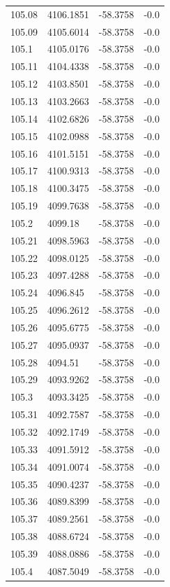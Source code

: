 \begin{table}[H]
\begin{tabular}{llll}
105.08 & 4106.1851 & -58.3758 & -0.0 \\
105.09 & 4105.6014 & -58.3758 & -0.0 \\
105.1 & 4105.0176 & -58.3758 & -0.0 \\
105.11 & 4104.4338 & -58.3758 & -0.0 \\
105.12 & 4103.8501 & -58.3758 & -0.0 \\
105.13 & 4103.2663 & -58.3758 & -0.0 \\
105.14 & 4102.6826 & -58.3758 & -0.0 \\
105.15 & 4102.0988 & -58.3758 & -0.0 \\
105.16 & 4101.5151 & -58.3758 & -0.0 \\
105.17 & 4100.9313 & -58.3758 & -0.0 \\
105.18 & 4100.3475 & -58.3758 & -0.0 \\
105.19 & 4099.7638 & -58.3758 & -0.0 \\
105.2 & 4099.18 & -58.3758 & -0.0 \\
105.21 & 4098.5963 & -58.3758 & -0.0 \\
105.22 & 4098.0125 & -58.3758 & -0.0 \\
105.23 & 4097.4288 & -58.3758 & -0.0 \\
105.24 & 4096.845 & -58.3758 & -0.0 \\
105.25 & 4096.2612 & -58.3758 & -0.0 \\
105.26 & 4095.6775 & -58.3758 & -0.0 \\
105.27 & 4095.0937 & -58.3758 & -0.0 \\
105.28 & 4094.51 & -58.3758 & -0.0 \\
105.29 & 4093.9262 & -58.3758 & -0.0 \\
105.3 & 4093.3425 & -58.3758 & -0.0 \\
105.31 & 4092.7587 & -58.3758 & -0.0 \\
105.32 & 4092.1749 & -58.3758 & -0.0 \\
105.33 & 4091.5912 & -58.3758 & -0.0 \\
105.34 & 4091.0074 & -58.3758 & -0.0 \\
105.35 & 4090.4237 & -58.3758 & -0.0 \\
105.36 & 4089.8399 & -58.3758 & -0.0 \\
105.37 & 4089.2561 & -58.3758 & -0.0 \\
105.38 & 4088.6724 & -58.3758 & -0.0 \\
105.39 & 4088.0886 & -58.3758 & -0.0 \\
105.4 & 4087.5049 & -58.3758 & -0.0 \\

\end{tabular}
\end{table}
